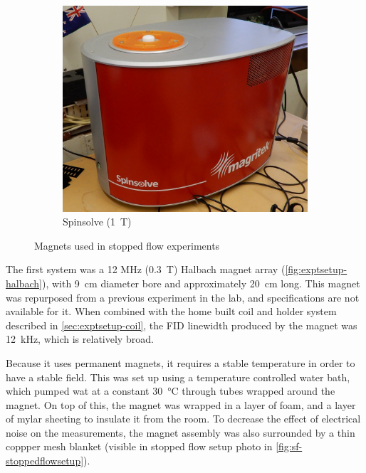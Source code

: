 \begin{figure}[t]
\begin{subfigure}[t]{0.4\textwidth}
\includegraphics[width=\textwidth]{figures/exptsetup/spinsolve.jpg}
\caption{Spinsolve (\SI{1}{T})}
\label{fig:exptsetup-spinsolve}
\end{subfigure}
\caption{Magnets used in stopped flow experiments}
\label{fig:exptsetup-stopflowmagnets}
\end{figure}

The first system was a 12 MHz (\SI{0.3}{T}) Halbach magnet array (\autoref{fig:exptsetup-halbach}), with \SI{9}{cm} diameter bore and approximately \SI{20}{\centi\metre} long.
This magnet was repurposed from a previous experiment in the lab, and specifications are not available for it.
When combined with the home built coil and holder system described in \autoref{sec:exptsetup-coil}, the FID linewidth produced by the magnet was \SI{12}{\kilo\hertz}, which is relatively broad.

Because it uses permanent magnets, it requires a stable temperature in order to have a stable field.
This was set up using a temperature controlled water bath, which pumped wat at a constant \SI{30}{\celsius} through tubes wrapped around the magnet.
On top of this, the magnet was wrapped in a layer of foam, and a layer of mylar sheeting to insulate it from the room.
To decrease the effect of electrical noise on the measurements, the magnet assembly was also surrounded by a thin coppper mesh blanket (visible in stopped flow setup photo in \autoref{fig:sf-stoppedflowsetup}).

